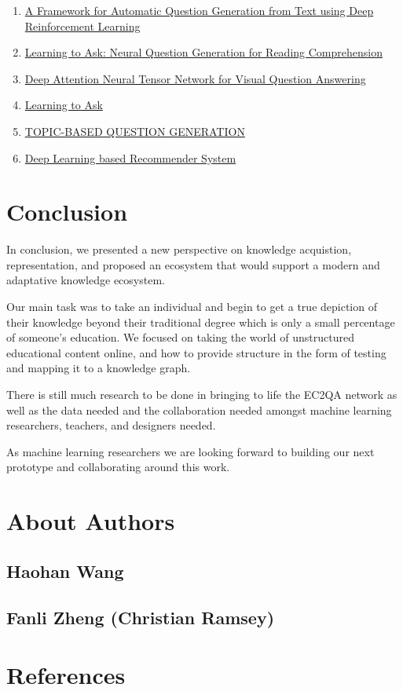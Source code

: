 \documentclass{acm_proc_article-sp}
\begin{document}
\begin{enumerate}
\def\labelenumi{\arabic{enumi}.}
\item
  \href{https://arxiv.org/pdf/1808.04961.pdf}{A Framework for Automatic
  Question Generation from Text using Deep Reinforcement Learning}
\item
  \href{https://arxiv.org/pdf/1705.00106.pdf}{Learning to Ask: Neural
  Question Generation for Reading Comprehension}
\item
  \href{http://openaccess.thecvf.com/content_ECCV_2018/papers/Yalong_Bai_Deep_Attention_Neural_ECCV_2018_paper.pdf}{Deep
  Attention Neural Tensor Network for Visual Question Answering}
\item
  \href{http://www.cs.cornell.edu/~xdu/papers/acl17_dsc_poster.pdf}{Learning
  to Ask}
\item
  \href{https://openreview.net/pdf?id=rk3pnae0b}{TOPIC-BASED QUESTION
  GENERATION}
\item
  \href{https://arxiv.org/pdf/1707.07435.pdf}{Deep Learning based
  Recommender System}
\end{enumerate}

\section{Conclusion}\label{conclusion}

In conclusion, we presented a new perspective on knowledge acquistion,
representation, and proposed an ecosystem that would support a modern
and adaptative knowledge ecosystem.

Our main task was to take an individual and begin to get a true
depiction of their knowledge beyond their traditional degree which is
only a small percentage of someone's education. We focused on taking the
world of unstructured educational content online, and how to provide
structure in the form of testing and mapping it to a knowledge graph.

There is still much research to be done in bringing to life the EC2QA
network as well as the data needed and the collaboration needed amongst
machine learning researchers, teachers, and designers needed.

As machine learning researchers we are looking forward to building our
next prototype and collaborating around this work.

\section{About Authors}\label{about-authors}

\subsection{Haohan Wang}\label{haohan-wang}

\subsection{Fanli Zheng (Christian
Ramsey)}\label{fanli-zheng-christian-ramsey}

\section{References}\label{references}
\setlength{\parindent}{0in}
\end{document}
